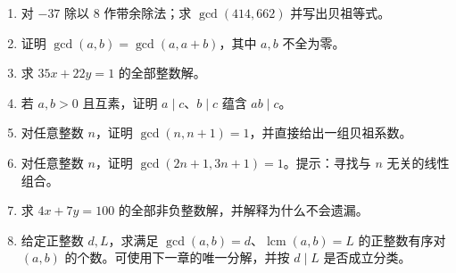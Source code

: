 \begin{enumerate}
 \item 对 $-37$ 除以 $8$ 作带余除法；求 $\gcd(414,662)$ 并写出贝祖等式。
 \item 证明 $\gcd(a,b)=\gcd(a,a+b)$，其中 $a,b$ 不全为零。
 \item 求 $35x+22y=1$ 的全部整数解。
 \item 若 $a,b>0$ 且互素，证明 $a\mid c$、$b\mid c$ 蕴含 $ab\mid c$。
 \item\label{ex:div-consecutive} 对任意整数 $n$，证明 $\gcd(n,n+1)=1$，并直接给出一组贝祖系数。
 \item\label{ex:div-combinations} 对任意整数 $n$，证明 $\gcd(2n+1,3n+1)=1$。提示：寻找与 $n$ 无关的线性组合。
 \item\label{ex:div-nonnegative} 求 $4x+7y=100$ 的全部非负整数解，并解释为什么不会遗漏。
 \item\label{ex:div-gcd-lcm-count} 给定正整数 $d,L$，求满足 $\gcd(a,b)=d$、$\operatorname{lcm}(a,b)=L$ 的正整数有序对 $(a,b)$ 的个数。可使用下一章的唯一分解，并按 $d\mid L$ 是否成立分类。
\end{enumerate}

